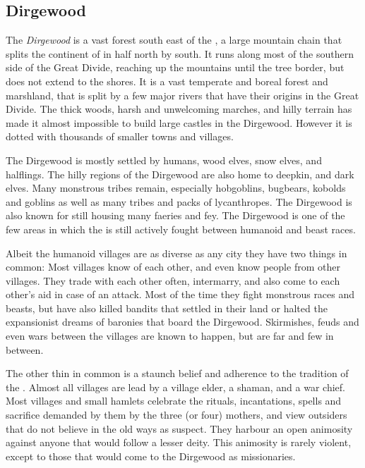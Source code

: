 \subsection{Dirgewood}
\label{sec:Dirgewood}

The \emph{Dirgewood} is a vast forest south east of the , a large mountain chain that splits the continent of
 in half north by south. It runs along most of the
southern side of the Great Divide, reaching up the mountains until the tree
border, but does not extend to the shores. It is a vast temperate and boreal
forest and marshland, that is split by a few major rivers that have their
origins in the Great Divide. The thick woods, harsh and unwelcoming marches,
and hilly terrain has made it almost impossible to build large castles in the
Dirgewood. However it is dotted with thousands of smaller towns and villages.

The Dirgewood is mostly settled by humans, wood elves, snow elves, and
halflings. The hilly regions of the Dirgewood are also home to deepkin, and
dark elves. Many monstrous tribes remain, especially hobgoblins, bugbears,
kobolds and goblins as well as many tribes and packs of lycanthropes. The
Dirgewood is also known for still housing many faeries and fey. The Dirgewood
is one of the few areas in which the  is still
actively fought between humanoid and beast races.

Albeit the humanoid villages are as diverse as any city they have two things
in common: Most villages know of each other, and even know people from other
villages. They trade with each other often, intermarry, and also come to each
other's aid in case of an attack. Most of the time they fight monstrous races
and beasts, but have also killed bandits that settled in their land or halted
the expansionist dreams of baronies that board the Dirgewood. Skirmishes,
feuds and even wars between the villages are known to happen, but are far and
few in between.

The other thin in common is a staunch belief and adherence to the tradition of
the . Almost all villages are lead by a village elder, a
shaman, and a war chief. Most villages and small hamlets celebrate the rituals,
incantations, spells and sacrifice demanded by them by the three (or four)
mothers, and view outsiders that do not believe in the old ways as
suspect. They harbour an open animosity against anyone that would follow a
lesser deity. This animosity is rarely violent, except to those that would
come to the Dirgewood as missionaries.

